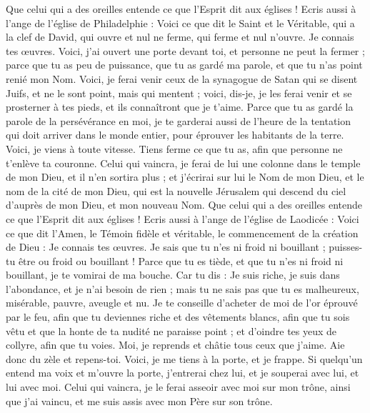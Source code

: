 \begin{multicols}{2}
Que celui qui a des oreilles entende ce que l'Esprit dit aux églises !
Ecris aussi à l'ange de l'église de Philadelphie : Voici ce que dit le Saint et le Véritable, qui a la clef de David, qui ouvre et nul ne ferme, qui ferme et nul n'ouvre.
Je connais tes œuvres. Voici, j'ai ouvert une porte devant toi, et personne ne peut la fermer ; parce que tu as peu de puissance, que tu as gardé ma parole, et que tu n'as point renié mon Nom.
Voici, je ferai venir ceux de la synagogue de Satan qui se disent Juifs, et ne le sont point, mais qui mentent ; voici, dis-je, je les ferai venir et se prosterner à tes pieds, et ils connaîtront que je t'aime.
Parce que tu as gardé la parole de la persévérance en moi, je te garderai aussi de l'heure de la tentation qui doit arriver dans le monde entier, pour éprouver les habitants de la terre.
Voici, je viens à toute vitesse. Tiens ferme ce que tu as, afin que personne ne t'enlève ta couronne.
Celui qui vaincra, je ferai de lui une colonne dans le temple de mon Dieu, et il n'en sortira plus ; et j'écrirai sur lui le Nom de mon Dieu, et le nom de la cité de mon Dieu, qui est la nouvelle Jérusalem qui descend du ciel d'auprès de mon Dieu, et mon nouveau Nom.
Que celui qui a des oreilles entende ce que l'Esprit dit aux églises !
Ecris aussi à l'ange de l'église de Laodicée : Voici ce que dit l'Amen, le Témoin fidèle et véritable, le commencement de la création de Dieu :
Je connais tes œuvres. Je sais que tu n'es ni froid ni bouillant ; puisses-tu être ou froid ou bouillant !
Parce que tu es tiède, et que tu n'es ni froid ni bouillant, je te vomirai de ma bouche.
Car tu dis : Je suis riche, je suis dans l'abondance, et je n'ai besoin de rien ; mais tu ne sais pas que tu es malheureux, misérable, pauvre, aveugle et nu.
Je te conseille d'acheter de moi de l'or éprouvé par le feu, afin que tu deviennes riche et des vêtements blancs, afin que tu sois vêtu et que la honte de ta nudité ne paraisse point ; et d'oindre tes yeux de collyre, afin que tu voies.
Moi, je reprends et châtie tous ceux que j'aime. Aie donc du zèle et repens-toi.
Voici, je me tiens à la porte, et je frappe. Si quelqu'un entend ma voix et m'ouvre la porte, j'entrerai chez lui, et je souperai avec lui, et lui avec moi.
Celui qui vaincra, je le ferai asseoir avec moi sur mon trône, ainsi que j'ai vaincu, et me suis assis avec mon Père sur son trône.

\end{multicols}
